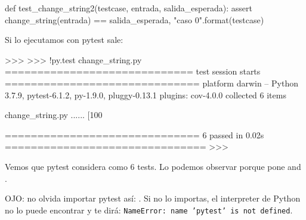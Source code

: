 \begin{ejercicio}
\begin{small}
\begin{python}
def test_change_string2(testcase, entrada, salida_esperada):
    assert change_string(entrada) == salida_esperada, "caso {0}".format(testcase)
\end{python}
\end{small}


Si lo ejecutamos con pytest sale:

\begin{small}
\begin{python}
>>> %
>>> !py.test change_string.py
============================= test session starts ==============================
platform darwin -- Python 3.7.9, pytest-6.1.2, py-1.9.0, pluggy-0.13.1
plugins: cov-4.0.0
collected 6 items

change_string.py ......                                                  [100%

============================== 6 passed in 0.02s ===============================
>>> 
\end{python}
\end{small}

Vemos que pytest considera  como 6 tests. Lo podemos observar porque pone  and .

OJO: no olvida importar pytest así:
. Si no lo importas, el interpreter de Python no lo puede encontrar y te dirá: \texttt{NameError: name 'pytest' is not defined}.

\end{ejercicio}



